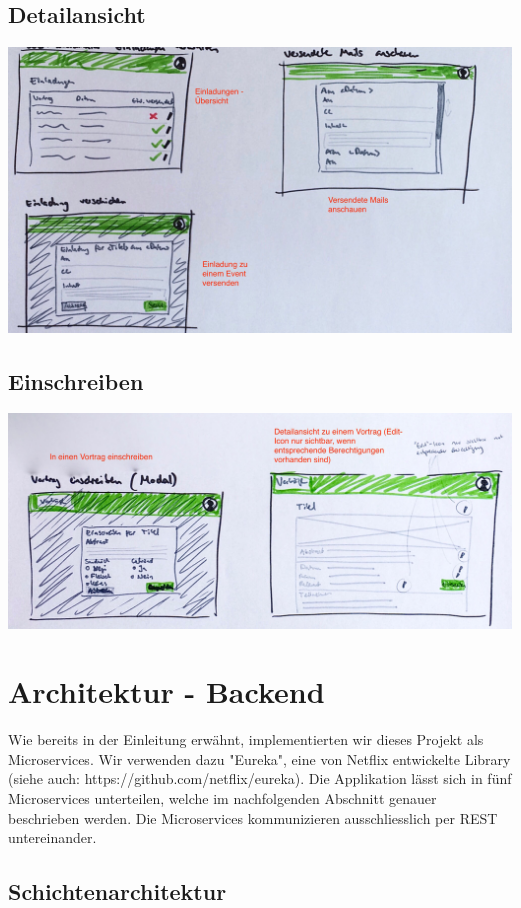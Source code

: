 \documentclass[11pt]{article} %
\begin{document}
\subsection{Detailansicht}
\includegraphics[width=1\textwidth]{prototyp/Einladungen}

\subsection{Einschreiben}
\includegraphics[width=1\textwidth]{prototyp/Vortrag}

\newpage
\section{Architektur - Backend}
Wie bereits in der Einleitung erwähnt, implementierten wir dieses Projekt als Microservices. Wir verwenden dazu "Eureka", eine von Netflix entwickelte Library (siehe auch: https://github.com/netflix/eureka). Die Applikation lässt sich in fünf Microservices unterteilen, welche im nachfolgenden Abschnitt genauer beschrieben werden. Die Microservices kommunizieren ausschliesslich per REST untereinander.

\subsection{Schichtenarchitektur}
\end{document}
